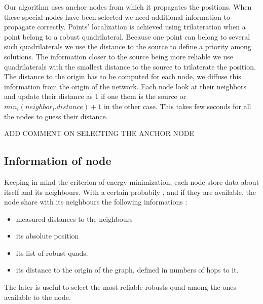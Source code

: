 \documentclass[letterpaper, 10 pt, conference]{ieeeconf}  %
\begin{document}
Our algorithm uses anchor nodes from which it propagates the positions. When these special nodes have been selected we need additional information to propagate correctly. Points' localization is achieved using trilateration when a point belong to a robust quadrilateral. Because one point can belong to several such quadrilaterals we use the distance to the source to define a priority among solutions. The information closer to the source being more reliable we use quadrilaterals with the smallest distance to the source to trilaterate the position. The distance to the origin has to be computed for each node, we diffuse this information from the origin of the network. Each node look at their neighbors and update their distance as 1 if one them is the source or $min_i(neighbor_i.distance) +1 $ in the other case. This takes few seconds for all the nodes to guess their distance.

ADD COMMENT ON SELECTING THE ANCHOR NODE

\subsection{Information of node}

Keeping in mind the criterion of energy minimization, each node store data about itself and its neighbours. With a certain probabily , and if they are available, the node share with its neighbours the following informations :

\begin{itemize}

\item measured distances to the neighbours
\item its absolute position
\item its list of robust quads.
\item its distance to the origin of the graph, defined in numbers of hops to it.

\end{itemize}

The later is useful to select the most reliable robusts-quad among the ones available to the node.

\end{document}

